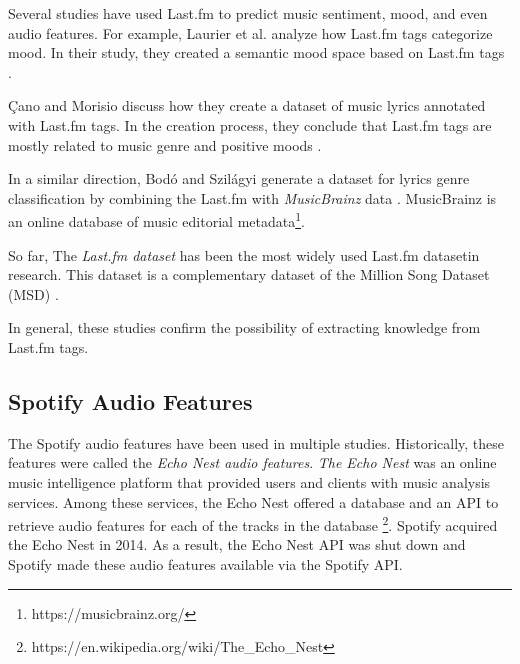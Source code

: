 \documentclass[sn-mathphys]{sn-jnl}%
\theoremstyle{thmstyleone}%
\theoremstyle{thmstyletwo}%
\theoremstyle{thmstylethree}%
\begin{document}
Several studies have used Last.fm to predict music sentiment, mood, and even audio features.
For example, Laurier et al. analyze how Last.fm tags categorize mood.
In their study, they created a semantic mood space based on Last.fm tags \cite{laurier2009music}.



{\c{C}}ano and Morisio discuss how they create a dataset of music
lyrics annotated with Last.fm tags.
In the creation process, they conclude that Last.fm tags are mostly related to music genre
and positive moods \cite{ccano2017music}.

In a similar direction, Bod{\'o} and Szil{\'a}gyi generate a dataset for lyrics genre classification
by combining the Last.fm with \emph{MusicBrainz} data \cite{bodo2018connecting}.
MusicBrainz is an online database of music editorial metadata\footnote[1]{https://musicbrainz.org/}.

So far, The \emph{Last.fm dataset} has been the most widely used Last.fm dataset\footnotemark[2] in research.
This dataset is a complementary dataset of the Million Song Dataset (MSD) \cite{Bertin-Mahieux2011}.


In general, these studies confirm the possibility of extracting knowledge from Last.fm tags.


\subsection{Spotify Audio Features}



The Spotify audio features have been used in multiple studies.
Historically, these features were called the \emph{Echo Nest audio features}.
\emph{The Echo Nest} was an online music intelligence platform that provided users and clients with music analysis services.
Among these services, the Echo Nest offered a database and an API to retrieve audio features for each of the tracks in the database \footnote[3]{https://en.wikipedia.org/wiki/The\_Echo\_Nest}.
Spotify acquired the Echo Nest in 2014.
As a result, the Echo Nest API was shut down and Spotify made these audio features available via the Spotify API.
\end{document}
